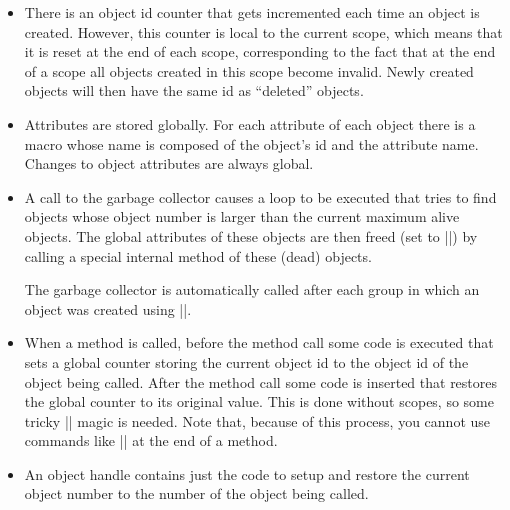 \begin{itemize}
\item There is an object id counter that gets incremented each time an
  object is created. However, this counter is local to the current
  scope, which means that it is reset at the end of each scope,
  corresponding to the fact that at the end of a scope all objects
  created in this scope become invalid. Newly created objects will
  then have the same id as ``deleted'' objects.
\item Attributes are stored globally. For each attribute of each
  object there is a macro whose name is composed of the object's id
  and the attribute name. Changes to object attributes are always
  global.
\item A call to the garbage collector causes a loop to be executed
  that tries to find objects whose object number is larger than the
  current maximum alive objects. The global attributes of these
  objects are then freed (set to |\relax|) by calling a special
  internal method of these (dead) objects.

  The garbage collector is automatically called after each group in
  which an object was created using |\aftergroup|.
\item When a method is called, before the method call some code is
  executed that sets a global counter storing the current object id to
  the object id of the object being called. After the method call some
  code is inserted that restores the global counter to its original
  value. This is done without scopes, so some tricky |\expandafter|
  magic is needed. Note that, because of this process, you cannot use
  commands like |\pgfutil@ifnextchar| at the end of a method.
\item An object handle contains just the code to setup and restore the
  current object number to the number of the object being called.
\end{itemize}